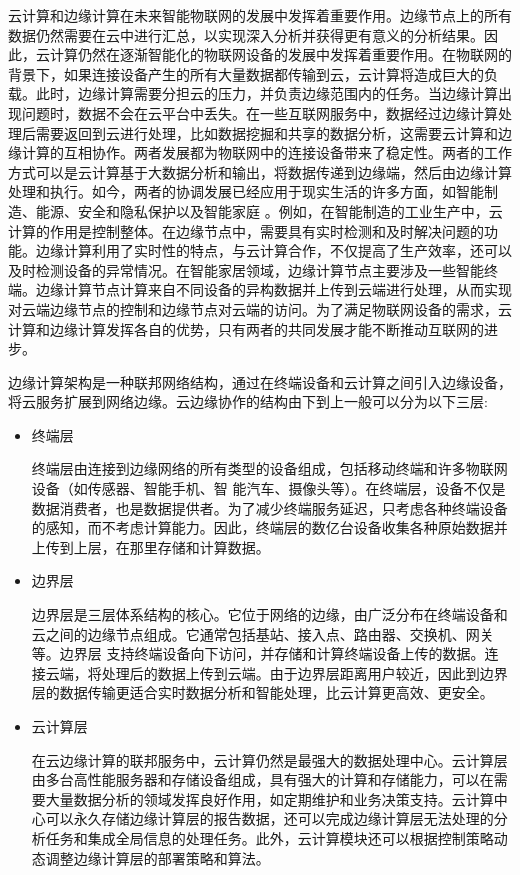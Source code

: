 \documentclass[UTF8,12pt,twoside,a4paper]{ctexart} %
\begin{document}
云计算和边缘计算在未来智能物联网的发展中发挥着重要作用。边缘节点上的所有数据仍然需要在云中进行汇总，以实现深入分析并获得更有意义的分析结果。因此，云计算仍然在逐渐智能化的物联网设备的发展中发挥着重要作用。在物联网的背景下，如果连接设备产生的所有大量数据都传输到云，云计算将造成巨大的负载。此时，边缘计算需要分担云的压力，并负责边缘范围内的任务。当边缘计算出现问题时，数据不会在云平台中丢失。在一些互联网服务中，数据经过边缘计算处理后需要返回到云进行处理，比如数据挖掘和共享的数据分析，这需要云计算和边缘计算的互相协作。两者发展都为物联网中的连接设备带来了稳定性。两者的工作方式可以是云计算基于大数据分析和输出，将数据传递到边缘端，然后由边缘计算处理和执行。如今，两者的协调发展已经应用于现实生活的许多方面，如智能制造、能源、安全和隐私保护以及智能家庭 。例如，在智能制造的工业生产中，云计算的作用是控制整体。在边缘节点中，需要具有实时检测和及时解决问题的功能。边缘计算利用了实时性的特点，与云计算合作，不仅提高了生产效率，还可以及时检测设备的异常情况。在智能家居领域，边缘计算节点主要涉及一些智能终端。边缘计算节点计算来自不同设备的异构数据并上传到云端进行处理，从而实现对云端边缘节点的控制和边缘节点对云端的访问。为了满足物联网设备的需求，云计算和边缘计算发挥各自的优势，只有两者的共同发展才能不断推动互联网的进步。
\vspace{10pt}

\begin{flushleft}
\end{flushleft}
\indent\setlength{\parindent}{2em}%
\songti
\hspace{1.6em}%
边缘计算架构是一种联邦网络结构，通过在终端设备和云计算之间引入边缘设备，将云服务扩展到网络边缘。云边缘协作的结构由下到上一般可以分为以下三层:
\begin{itemize}
    \item 终端层

    终端层由连接到边缘网络的所有类型的设备组成，包括移动终端和许多物联网设备（如传感器、智能手机、智 能汽车、摄像头等）。在终端层，设备不仅是数据消费者，也是数据提供者。为了减少终端服务延迟，只考虑各种终端设备的感知，而不考虑计算能力。因此，终端层的数亿台设备收集各种原始数据并上传到上层，在那里存储和计算数据。
    
    \item 边界层

    边界层是三层体系结构的核心。它位于网络的边缘，由广泛分布在终端设备和云之间的边缘节点组成。它通常包括基站、接入点、路由器、交换机、网关等。边界层 支持终端设备向下访问，并存储和计算终端设备上传的数据。连接云端，将处理后的数据上传到云端。由于边界层距离用户较近，因此到边界层的数据传输更适合实时数据分析和智能处理，比云计算更高效、更安全。
    
    \item 云计算层
    
    在云边缘计算的联邦服务中，云计算仍然是最强大的数据处理中心。云计算层由多台高性能服务器和存储设备组成，具有强大的计算和存储能力，可以在需要大量数据分析的领域发挥良好作用，如定期维护和业务决策支持。云计算中心可以永久存储边缘计算层的报告数据，还可以完成边缘计算层无法处理的分析任务和集成全局信息的处理任务。此外，云计算模块还可以根据控制策略动态调整边缘计算层的部署策略和算法。
\end{itemize}
\end{document}
